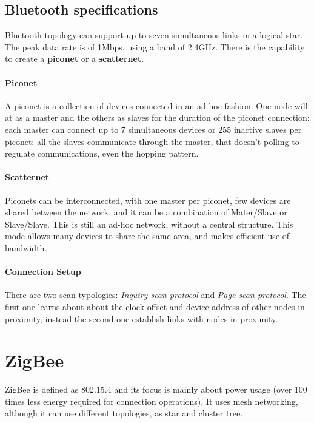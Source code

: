 \subsection{Bluetooth specifications}

Bluetooth topology can support up to seven simultaneous links in a logical star.
The peak data rate is of 1Mbps, using a band of 2.4GHz.
There is the capability to create a \textbf{piconet} or a \textbf{scatternet}.

\paragraph*{Piconet} A piconet is a collection of devices connected in an ad-hoc
fashion. One node will at as a master and the others as slaves for the duration
of the piconet connection: each master can connect up to 7 simultaneous devices
or 255 inactive slaves per piconet: all the slaves communicate through the
master, that doesn't polling to regulate communications, even the hopping
pattern.

\paragraph*{Scatternet} Piconets can be interconnected, with one master per
piconet, few devices are shared between the network, and it can be a combination
of Mater/Slave or Slave/Slave. This is still an ad-hoc network, without a
central structure. This mode allows many devices to share the same area, and
makes efficient use of bandwidth.

\paragraph*{Connection Setup} There are two scan typologies:
\textit{Inquiry-scan protocol} and \textit{Page-scan protocol}. The first one
learns about about the clock offset and device address of other nodes in
proximity, instead the second one establish links with nodes in proximity.

\section{ZigBee}

ZigBee is defined as 802.15.4 and its focus is mainly about power usage (over
100 times less energy required for connection operations). It uses mesh
networking, although it can use different topologies, as star and cluster tree.

